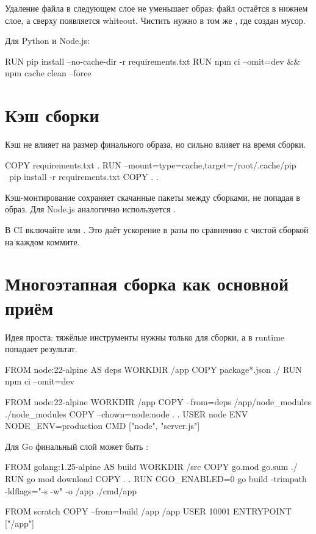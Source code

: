 Удаление файла в следующем слое не уменьшает образ: файл остаётся
в нижнем слое, а сверху появляется whiteout. Чистить нужно в том же
, где создан мусор.

Для Python и Node.js:

\begin{code}[language=dockerfile]
RUN pip install --no-cache-dir -r requirements.txt
RUN npm ci --omit=dev && npm cache clean --force
\end{code}

\section{Кэш сборки}

Кэш не влияет на размер финального образа, но сильно влияет на время
сборки.

\begin{code}[language=dockerfile]
COPY requirements.txt .
RUN --mount=type=cache,target=/root/.cache/pip \
    pip install -r requirements.txt
COPY . .
\end{code}

Кэш-монтирование сохраняет скачанные пакеты между сборками, не попадая
в образ. Для Node.js аналогично используется \cmd{/root/.npm}.

\begin{tipbox}
В CI включайте  или
. Это даёт ускорение в разы по сравнению
с чистой сборкой на каждом коммите.
\end{tipbox}

\section{Многоэтапная сборка как основной приём}

Идея проста: тяжёлые инструменты нужны только для сборки, а в runtime
попадает результат.

\begin{code}[language=dockerfile]
FROM node:22-alpine AS deps
WORKDIR /app
COPY package*.json ./
RUN npm ci --omit=dev

FROM node:22-alpine
WORKDIR /app
COPY --from=deps /app/node_modules ./node_modules
COPY --chown=node:node . .
USER node
ENV NODE_ENV=production
CMD ["node", "server.js"]
\end{code}

Для Go финальный слой может быть :

\begin{code}[language=dockerfile]
FROM golang:1.25-alpine AS build
WORKDIR /src
COPY go.mod go.sum ./
RUN go mod download
COPY . .
RUN CGO_ENABLED=0 go build -trimpath -ldflags="-s -w" -o /app ./cmd/app

FROM scratch
COPY --from=build /app /app
USER 10001
ENTRYPOINT ["/app"]
\end{code}


